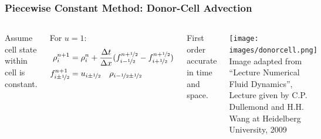 
\begin{frame}
	\frametitle{Piecewise Constant Method: Donor-Cell Advection}
	
	\begin{columns}
			Assume cell state within cell is constant.
			
			For $u = 1$:
			\begin{align*}
			\rho_i ^{n+1} &= \rho_i^{n} + 
			\frac{\Delta t}{\Delta x} (f_{i-\nicefrac{1}{2}}^{n+\nicefrac{1}{2}} - f_{i+\nicefrac{1}{2}}^{n+\nicefrac{1}{2}} )\\
			f_{i\pm\nicefrac{1}{2}}^{n+1} &= u_{i\pm\nicefrac{1}{2}}\quad \rho_{i - \nicefrac{1}{2} \pm \nicefrac{1}{2}}
			\end{align*}
			
			First order accurate in time and space.
			
			\centering
			\texttt{[image: images/donorcell.png]}
			\tiny{
				Image adapted from ``Lecture Numerical Fluid Dynamics'', Lecture given by C.P. Dullemond and H.H. Wang at Heidelberg University, 2009
			}
		
	\end{columns}
\end{frame}	







